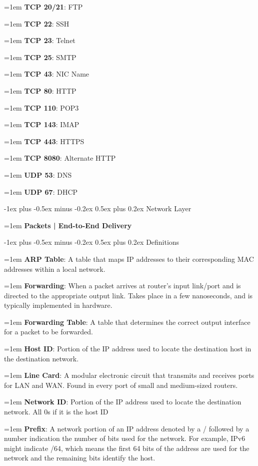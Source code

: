 \documentclass[letterpaper,8pt]{extarticle}
\makeatletter
\newcommand{\definition}[2]{
  \hangindent=1em
  \textbf{#1}: #2%
}
\newcommand{\subtitle}[2]{
  \hangindent=1em
  \textbf{\color{h4}#1 | #2}\\
  \hrulefill
}
\renewcommand{\section}{\@startsection{section}{1}{0mm}%
  {-1ex plus -0.5ex minus -0.2ex}%
  {0.5ex plus 0.2ex}%
{\color{h1} \normalfont\small\bfseries}}
\renewcommand{\subsection}{\@startsection{subsection}{2}{0mm}%
  {-1ex plus -0.5ex minus -0.2ex}%
  {0.5ex plus 0.2ex}%
{\color{h2}\normalfont\fontsize{6}{6}\selectfont\bfseries}}
\makeatother
\begin{document}
\begin{multicols*}{5}
\begin{multicols*}{3}
    \definition{TCP 20/21}{FTP}

    \definition{TCP 22}{SSH}

    \definition{TCP 23}{Telnet}

    \definition{TCP 25}{SMTP}

    \definition{TCP 43}{NIC Name}

    \definition{TCP 80}{HTTP}

    \definition{TCP 110}{POP3}

    \definition{TCP 143}{IMAP}

    \definition{TCP 443}{HTTPS}

    \definition{TCP 8080}{Alternate HTTP}

    \definition{UDP 53}{DNS}

    \definition{UDP 67}{DHCP}

  \end{multicols*}

  \section{Network Layer}

  \subtitle{Packets}{End-to-End Delivery}

  \subsection{Definitions}

  \definition{ARP Table}{A table that maps IP addresses to their corresponding MAC addresses within a local network.}

  \definition{Forwarding}{When a packet arrives at router's input link/port and is directed to the appropriate output link. Takes place in a few nanoseconds, and is typically implemented in hardware.}

  \definition{Forwarding Table}{A table that determines the correct output interface for a packet to be forwarded.}

  \definition{Host ID}{Portion of the IP address used to locate the destination host in the destination network.}

  \definition{Line Card}{A modular electronic circuit that transmits and receives ports for LAN and WAN. Found in every port of small and medium-sized routers.}

  \definition{Network ID}{Portion of the IP address used to locate the destination network. All 0s if it is the host ID}

  \definition{Prefix}{A network portion of an IP address denoted by a / followed by a number indication the number of bits used for the network. For example, IPv6 might indicate /64, which means the first 64 bits of the address are used for the network and the remaining bits identify the host.}


\end{multicols*}
\end{document}
